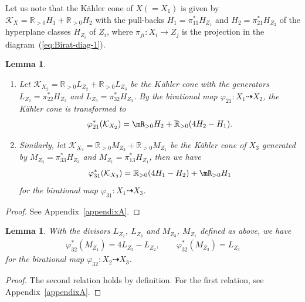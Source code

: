 \documentclass[10pt,a4paper]{amsart}
\numberwithin{equation}{section}
\newtheorem{Lemma}[Theorem]{Lemma}
\begin{document}
Let us note that the K\"ahler cone of $X(=X_{1})$ is given by $\mathcal{K}_{X}=\mathbb{R}_{>0}H_{1}+\mathbb{R}_{>0}H_{2}$ with the pull-backs $H_{1}=\pi_{11}^{*}H_{Z_{1}}$ and $H_{2}=\pi_{21}^{*}H_{Z_{2}}$ of the hyperplane classes $H_{Z_{i}}$ of $Z_{i}$, where $\pi_{ji}\colon X_{i}\to Z_{j}$ is the projection in the diagram~(\ref{eq:Birat-diag-1}).
\begin{Lemma}\label{lem:KahlerX2}\quad
\begin{enumerate}\itemsep=0pt

\item[$(1)$] Let $\mathcal{K}_{X_{2}}=\mathbb{R}_{>0}L_{Z_{2}}+\mathbb{R}_{>0}L_{Z_{3}}$
be the $K$\"ahler cone with the generators $L_{Z_{2}}=\pi_{22}^{*}H_{Z_{2}}$
and $L_{Z_{3}}=\pi_{32}^{*}H_{Z_{3}}$. By the birational map $\varphi_{21}\colon X_{1}\dashrightarrow X_{2}$,
the K\"ahler cone is transformed to
\begin{gather*}
\varphi_{21}^{*}(\mathcal{K}_{X_{2}})=\mR_{>0}H_{2}+\mathbb{R}_{>0}(4H_{2}-H_{1}).
\end{gather*}
\item[$(2)$] Similarly, let $\mathcal{K}_{X_{3}}=\mathbb{R}_{>0}M_{Z_{3}}+\mathbb{R}_{>0}M_{Z_{1}}$
be the K\"ahler cone of $X_{3}$ generated by $M_{Z_{3}}=\pi_{33}^{*}H_{Z_{3}}$
and $M_{Z_{1}}=\pi_{13}^{*}H_{Z_{1}}$, then we have
\begin{gather*}
\varphi_{31}^{*}(\mathcal{K}_{X_{3}})=\mathbb{R}_{>0}(4H_{1}-H_{2})+\mR_{>0}H_{1}
\end{gather*}
for the birational map $\varphi_{31}\colon X_{1}\dashrightarrow X_{3}$.
\end{enumerate}
\end{Lemma}
\begin{proof}
See Appendix~\ref{appendixA}. \end{proof}

\begin{Lemma}\label{lem:KahlerX3}With the divisors $L_{Z_{2}}$, $L_{Z_{3}}$ and $M_{Z_{3}}$, $M_{Z_{1}}$ defined as above, we have
\begin{gather*}
\varphi_{32}^{*}(M_{Z_{1}})=4L_{Z_{3}}-L_{Z_{2}},\qquad \varphi_{32}^{*}(M_{Z_{3}})=L_{Z_{3}}
\end{gather*}
for the birational map $\varphi_{32}\colon X_{2}\dashrightarrow X_{3}$.\end{Lemma}
\begin{proof} The second relation holds by definition. For the first relation, see Appendix~\ref{appendixA}.
\end{proof}
\end{document}
